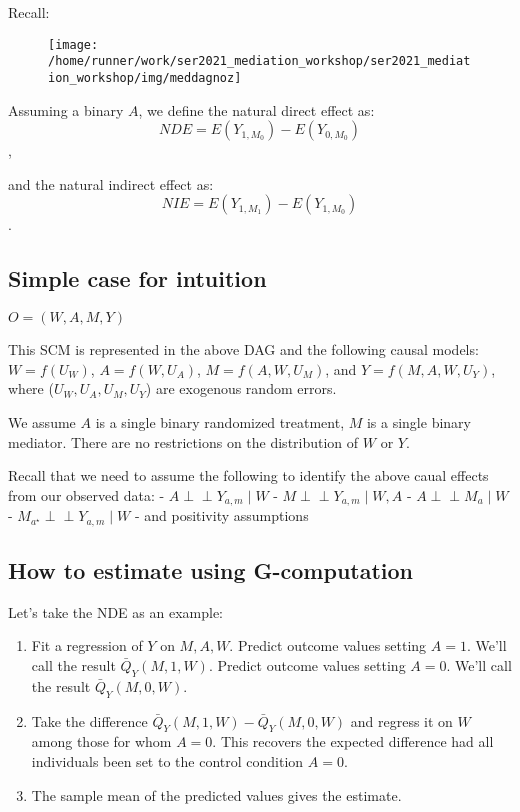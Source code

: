 \documentclass[
  12pt, krantz2,
]{book}
\providecommand{\tightlist}{%
  \setlength{\itemsep}{0pt}\setlength{\parskip}{0pt}}
\theoremstyle{definition}
\theoremstyle{definition}
\theoremstyle{definition}
\newcommand{\indep}{\mbox{$\perp\!\!\!\perp$}}
\newcommand{\1}{\mathbbm{1}}
\begin{document}
Recall:

\begin{figure}

{\centering \texttt{[image: /home/runner/work/ser2021\_mediation\_workshop/ser2021\_mediation\_workshop/img/meddagnoz]} 

}

\end{figure}

Assuming a binary \(A\), we define the natural direct effect as:
\[NDE = E(Y_{1,M_{0}}) - E(Y_{0,M_{0}})\],

and the natural indirect effect as:
\[NIE = E(Y_{1,M_{1}}) - E(Y_{1,M_{0}})\].

\hypertarget{simple-case-for-intuition}{%
\subsection{Simple case for intuition}\label{simple-case-for-intuition}}

\(O=(W, A, M, Y)\)

This SCM is represented in the above DAG and the following causal models:
\(W=f(U_W)\), \(A=f(W,U_A)\), \(M=f(A, W,U_M)\), and \(Y=f(M,A,W,U_Y)\), where (\(U_W, U_A,U_M, U_Y\)) are exogenous random errors.

We assume \(A\) is a single binary randomized treatment, \(M\) is a single binary
mediator. There are no restrictions on the distribution of \(W\) or \(Y\).

Recall that we need to assume the following to identify the above caual effects
from our observed data:
- \(A \indep Y_{a,m} \mid W\)
- \(M \indep Y_{a,m} \mid W, A\)
- \(A \indep M_a \mid W\)
- \(M_{a^{\star}} \indep Y_{a,m} \mid W\)
- and positivity assumptions

\hypertarget{how-to-estimate-using-g-computation}{%
\subsection{How to estimate using G-computation}\label{how-to-estimate-using-g-computation}}

Let's take the NDE as an example:

\begin{enumerate}
\def\labelenumi{\arabic{enumi}.}
\tightlist
\item
  Fit a regression of \(Y\) on \(M,A,W\). Predict outcome values setting \(A=1\).
  We'll call the result \(\bar{Q}_Y(M,1,W)\). Predict outcome values setting
  \(A=0\). We'll call the result \(\bar{Q}_Y(M,0,W)\).
\item
  Take the difference \(\bar{Q}_Y(M,1,W) - \bar{Q}_Y(M,0,W)\) and regress it on
  \(W\) among those for whom \(A=0\). This recovers the expected difference had all
  individuals been set to the control condition \(A = 0\).
\item
  The sample mean of the predicted values gives the estimate.
\end{enumerate}
\end{document}
